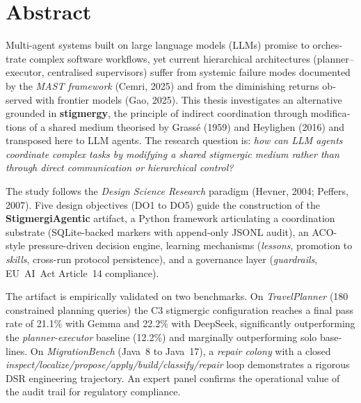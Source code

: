 \chapter*{Abstract}

\begin{otherlanguage}{english}

Multi-agent systems built on large language models (LLMs) promise to
orchestrate complex software workflows, yet current hierarchical
architectures (planner--executor, centralised supervisors) suffer from
systemic failure modes documented by the \emph{MAST framework} (Cemri,
2025) and from the diminishing returns observed with frontier models
(Gao, 2025). This thesis investigates an alternative grounded in
\textbf{stigmergy}, the principle of indirect coordination through
modifications of a shared medium theorised by Grass\'e (1959) and
Heylighen (2016) and transposed here to LLM agents. The research
question is: \emph{how can LLM agents coordinate complex tasks by
modifying a shared stigmergic medium rather than through direct
communication or hierarchical control?}

The study follows the \emph{Design Science Research} paradigm
(Hevner, 2004; Peffers, 2007). Five design objectives (DO1 to DO5)
guide the construction of the \textbf{StigmergiAgentic} artifact, a
Python framework articulating a coordination substrate (SQLite-backed
markers with append-only JSONL audit), an ACO-style pressure-driven
decision engine, learning mechanisms (\emph{lessons}, promotion to
\emph{skills}, cross-run protocol persistence), and a governance layer
(\emph{guardrails}, EU~AI~Act Article~14 compliance).

The artifact is empirically validated on two benchmarks. On
\emph{TravelPlanner} (180 constrained planning queries) the C3
stigmergic configuration reaches a final pass rate of 21.1\% with
Gemma and 22.2\% with DeepSeek, significantly outperforming the
\emph{planner-executor} baseline (12.2\%) and marginally outperforming
solo baselines. On \emph{MigrationBench} (Java~8 to Java~17), a
\emph{repair colony} with a closed
\emph{inspect/localize/propose/apply/build/classify/repair} loop
demonstrates a rigorous DSR engineering trajectory. An expert panel
confirms the operational value of the audit trail for regulatory
compliance.


\end{otherlanguage}
